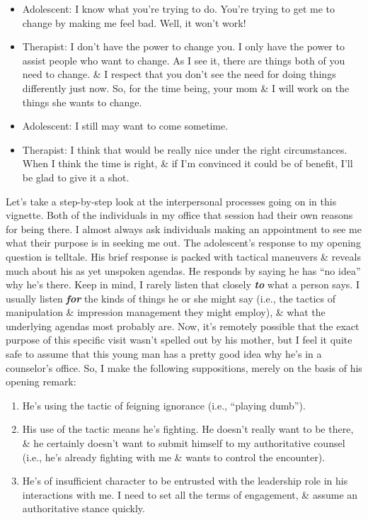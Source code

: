 \documentclass{article}
\numberwithin{equation}{section}
\begin{document}
\begin{itemize}
	(Turned toward son): I think it would be nice for us to visit under the right circumstances. I have a lot of things you may find useful in making important changes in your life.
	\item Adolescent: I know what you're trying to do. You're trying to get me to change by making me feel bad. Well, it won't work!
	\item Therapist: I don't have the power to change you. I only have the power to assist people who want to change. As I see it, there are things both of you need to change. \& I respect that you don't see the need for doing things differently just now. So, for the time being, your mom \& I will work on the things she wants to change.
	\item Adolescent: I still may want to come sometime.
	\item Therapist: I think that would be really nice under the right circumstances. When I think the time is right, \& if I'm convinced it could be of benefit, I'll be glad to give it a shot.
\end{itemize}
Let's take a step-by-step look at the interpersonal processes going on in this vignette. Both of the individuals in my office that session had their own reasons for being there. I almost always ask individuals making an appointment to see me what their purpose is in seeking me out. The adolescent's response to my opening question is telltale. His brief response is packed with tactical maneuvers \& reveals much about his as yet unspoken agendas. He responds by saying he has ``no idea'' why he's there. Keep in mind, I rarely listen that closely \textbf{\textit{to}} what a person says. I usually listen \textbf{\textit{for}} the kinds of things he or she might say (i.e., the tactics of manipulation \& impression management they might employ), \& what the underlying agendas most probably are. Now, it's remotely possible that the exact purpose of this specific visit wasn't spelled out by his mother, but I feel it quite safe to assume that this young man has a pretty good idea why he's in a counselor's office. So, I make the following suppositions, merely on the basis of his opening remark:
\begin{enumerate}
	\item He's using the tactic of feigning ignorance (i.e., ``playing dumb'').
	\item His use of the tactic means he's fighting. He doesn't really want to be there, \& he certainly doesn't want to submit himself to my authoritative counsel (i.e., he's already fighting with me \& wants to control the encounter).
	\item He's of insufficient character to be entrusted with the leadership role in his interactions with me. I need to set all the terms of engagement, \& assume an authoritative stance quickly.
\end{enumerate}
\end{document}
